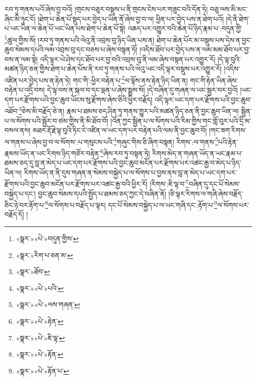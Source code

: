 རབ་ཏུ་གནས་པའོ་ཞེས་བྱ་བའོ། །གྲངས་བཅུར་བསྡུས་པ་ནི་གྲངས་ངེས་པར་གཟུང་བའི་དོན་ཏེ། བཅུ་ལས་མི་མང་ཞིང་མི་ཉུང་ངོ། །ཐེག་པ་ཆེན་པོ་སྡུད་པར་བྱེད་པ་ཡིན་ནོ་ཞེས་བྱ་བ་ལ། ཕྱིན་པར་བྱེད་པས་ན་ཐེག་པའོ། །དེ་ནི་ཐེག་པ་ཡང་ཡིན་ལ་ཆེན་པོ་ཡང་ཡིན་པས་ཐེག་པ་ཆེན་པོ་སྟེ། འཆད་པར་འགྱུར་བའི་ཆེན་པོ་ཉིད་རྣམ་པ་:བདུན་གྱི་\footnote{«སྣར་»«པེ་»བདུན་གྱིས་}ཚུལ་གྱིས་སོ། །རབ་ཏུ་གནས་པའི་ལེའུ་ནི་འབྲས་བུ་ཉིད་ཡིན་པས་ན། ཐེག་པ་ཆེན་པོར་མ་བསྡུས་པས་དེས་ན་བྱང་ཆུབ་སེམས་དཔའི་ལམ་འབྲས་བུ་དང་བཅས་པ་ཞེས་བསྟན་ཏོ། །འདིས་ཐོབ་པར་བྱེད་པས་ན་ལམ་མམ་ཐོབ་པར་བྱ་བས་ན་ལམ་སྟེ། འདི་ལྟར་ཡེ་ཤེས་དང་ཐོབ་པར་བྱ་བའི་འབྲས་བུ་ནི་ལམ་ཞེས་བསྟན་པར་འགྱུར་རོ། །དེ་ལྟ་བུའི་མཚན་ཉིད་ཅན་གྱིས་ཐེག་པ་ཆེན་པོས་ནི་རབ་ཏུ་གནས་པའི་ལེའུ་ཡང་འདི་ལྟར་བསྡུས་པར་འགྱུར་རོ། །འདིས་འཛིན་པར་བྱེད་པས་ན་རྟེན་ཏེ། གང་གི་:ཕྱིར་བརྟེན་པ་\footnote{«སྣར་»རིག་པ་ཅན་མ་}ལ་ལྟོས་ནས་རྟེན་ཉིད་ཡིན་ན། གང་གི་རྟེན་ཡིན་ཞེས་བརྟེན་པ་འདྲི་བས། དེ་ལྟ་བས་ན་སྐལ་བ་དང་ལྡན་པ་ཞེས་སྨྲས་སོ། །དེ་བཞིན་དུ་གཞན་ལ་ཡང་སྦྱར་བར་བྱའོ། །ཡང་དག་པར་རྫོགས་པའི་བྱང་ཆུབ་ཡོངས་སུ་རྫོགས་ཞེས་ཅིའི་ཕྱིར་བརྗོད། འདི་ལྟར་ཡང་དག་པར་རྫོགས་པའི་བྱང་ཆུབ་འཐོབ་\footnote{«སྣར་»ཐོབ་}ཅེས་མི་བརྗོད་ཅེ་ན། རྣམ་པ་ཐམས་ཅད་ཤིན་ཏུ་གནས་གྱུར་པའི་མཚན་ཉིད་ཅན་ནི་བྱང་ཆུབ་ཡིན་ལ། སྦྱིན་པ་ལ་སོགས་པའི་སྦྱོར་བ་ཙམ་གྱིས་ནི་མི་ཐོབ་བོ། །འོན་ཀྱང་སྦྱིན་པ་ལ་སོགས་པའི་རིམ་གྱིས་གང་གློ་བུར་པའི་དྲི་མ་བསལ་ནས། མཐར་རྡོ་རྗེ་ལྟ་བུའི་ཏིང་ངེ་འཛིན་ལ་ཡང་དག་པར་བརྟེན་པའི་ལམ་ནི་བྱང་ཆུབ་བོ། །གང་ཟག་རིགས་ལ་གནས་པ་ཞེས་བྱ་བ་ལ་སོགས་:པ་གསུངས་པའི་\footnote{«སྣར་»«པེ་»པའི་}གཞུང་གིས་ཅི་ཞིག་བསྟན། རིགས་:ལ་གནས་\footnote{«སྣར་»«པེ་»ལས་གཞན་}པའི་རྟེན་རྣམས་ཡོད་ན་ཡང་རིགས་ཉིད་གཙོར་བརྟེན་\footnote{«སྣར་»«པེ་»རྟེན་}ཞེས་རབ་ཏུ་བསྟན་ཏེ། རིགས་མེད་ན་གཞན་ཡོད་ན་ཡང་རྣམ་པ་ཐམས་ཅད་དུ་བླ་ན་མེད་པ་ཡང་དག་པར་རྫོགས་པའི་བྱང་ཆུབ་མངོན་པར་རྫོགས་པར་འཚང་རྒྱ་བ་མེད་པ་ཉིད་ཡིན་ལ། རིགས་ཡོད་ན་ནི་དུས་གཞན་ན་སེམས་བསྐྱེད་པ་ལ་སོགས་པ་བྱས་ནས་བླ་ན་མེད་པ་ཡང་དག་པར་རྫོགས་པའི་བྱང་ཆུབ་མངོན་པར་རྫོགས་པར་འཚང་རྒྱ་བའི་ཕྱིར་རོ། །རིགས་:ཇི་ལྟ་བ་\footnote{«སྣར་»«པེ་»ཇི་ལྟ་}བཞིན་དུ་དང་པོ་སེམས་བསྐྱེད་པ་དང་། བྱང་ཆུབ་སེམས་དཔའི་སྤྱོད་པ་ཐམས་ཅད་ཀྱང་དེ་བཞིན་ནོ། །ཅི་ལྟར་རིགས་ལ་གཞི་ཞེས་བརྗོད་ཅིང་ཉེ་བར་རྟོག་པ་\footnote{«སྣར་»«པེ་»རྟོན་}ལ་སོགས་པ་བརྗོད་པ་ལྟར། དང་པོ་སེམས་བསྐྱེད་པ་ལ་ཡང་གཞི་དང་:རྟོག་པ་\footnote{«སྣར་»«པེ་»རྟོན་པ་}ལ་སོགས་པར་བརྗོད་དོ། །
